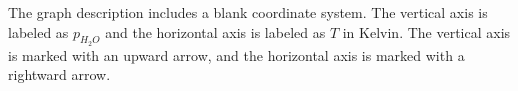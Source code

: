 The graph description includes a blank coordinate system. The vertical axis is labeled as \( p_{H_2O} \) and the horizontal axis is labeled as \( T \) in Kelvin. The vertical axis is marked with an upward arrow, and the horizontal axis is marked with a rightward arrow.